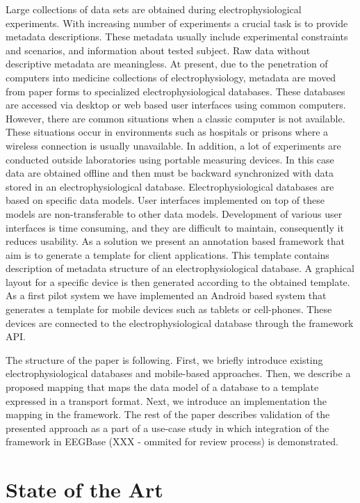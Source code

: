\documentclass[a4paper,twoside]{article}
\begin{document}
Large collections of data sets are obtained during electrophysiological experiments. With increasing number of experiments a crucial task is to provide metadata descriptions. These metadata usually include experimental constraints and scenarios, and information about tested subject. Raw data without descriptive metadata are meaningless. At present, due to the penetration of computers into medicine collections of electrophysiology, metadata are moved from paper forms to specialized electrophysiological databases. These databases are accessed via desktop or web based user interfaces using common computers. However, there are common situations when a classic computer is not available. These situations occur in environments such as hospitals or prisons where a wireless connection is usually unavailable. In addition, a lot of experiments are conducted outside laboratories using portable measuring devices. In this case data are obtained offline and then must be backward synchronized with data stored in an electrophysiological database. Electrophysiological databases are based on specific data models. User interfaces implemented on top of these models are non-transferable to other data models. Development of various user interfaces is time consuming, and they are difficult to maintain, consequently it reduces usability. As a solution we present an annotation based framework that aim is to generate a template for client applications. This template contains description of metadata structure of an electrophysiological database. A graphical layout for a specific device is then generated according to the obtained template.  As a first pilot system we have implemented an Android based system that generates a template for mobile devices such as tablets or cell-phones. These devices are connected to the electrophysiological database through the framework API.

The structure of the paper is following. First, we briefly introduce existing electrophysiological databases and mobile-based approaches. Then, we describe a proposed mapping that maps the data model of a database to a template expressed in a transport format. Next, we introduce an implementation the mapping in the framework. The rest of the paper describes validation of the presented approach as a part of a use-case study in which integration of the framework in EEGBase (XXX - ommited for review process) is demonstrated.

\section{State of the Art}
\end{document}
